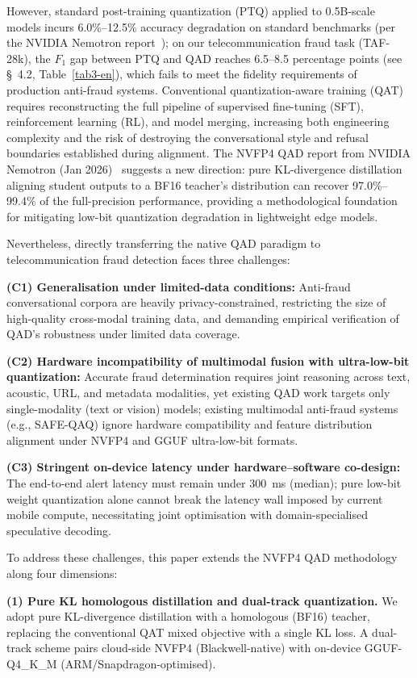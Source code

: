 \documentclass[11pt, a4paper]{article}
\begin{document}
However, standard post-training quantization (PTQ) applied to 0.5B-scale models incurs 6.0\%--12.5\% accuracy degradation on standard benchmarks (per the NVIDIA Nemotron report~\cite{3}); on our telecommunication fraud task (TAF-28k), the $F_1$ gap between PTQ and QAD reaches 6.5--8.5 percentage points (see \S~4.2, Table~\ref{tab3-en}), which fails to meet the fidelity requirements of production anti-fraud systems. Conventional quantization-aware training (QAT) requires reconstructing the full pipeline of supervised fine-tuning (SFT), reinforcement learning (RL), and model merging, increasing both engineering complexity and the risk of destroying the conversational style and refusal boundaries established during alignment. The NVFP4 QAD report from NVIDIA Nemotron (Jan 2026)~\cite{3} suggests a new direction: pure KL-divergence distillation aligning student outputs to a BF16 teacher's distribution can recover 97.0\%--99.4\% of the full-precision performance, providing a methodological foundation for mitigating low-bit quantization degradation in lightweight edge models.

Nevertheless, directly transferring the native QAD paradigm to telecommunication fraud detection faces three challenges:

\textbf{(C1) Generalisation under limited-data conditions:} Anti-fraud conversational corpora are heavily privacy-constrained, restricting the size of high-quality cross-modal training data, and demanding empirical verification of QAD's robustness under limited data coverage.

\textbf{(C2) Hardware incompatibility of multimodal fusion with ultra-low-bit quantization:} Accurate fraud determination requires joint reasoning across text, acoustic, URL, and metadata modalities, yet existing QAD work targets only single-modality (text or vision) models; existing multimodal anti-fraud systems (e.g., SAFE-QAQ) ignore hardware compatibility and feature distribution alignment under NVFP4 and GGUF ultra-low-bit formats.

\textbf{(C3) Stringent on-device latency under hardware--software co-design:} The end-to-end alert latency must remain under 300~ms (median); pure low-bit weight quantization alone cannot break the latency wall imposed by current mobile compute, necessitating joint optimisation with domain-specialised speculative decoding.

To address these challenges, this paper extends the NVFP4 QAD methodology along four dimensions:

\textbf{(1) Pure KL homologous distillation and dual-track quantization.} We adopt pure KL-divergence distillation with a homologous (BF16) teacher, replacing the conventional QAT mixed objective with a single KL loss. A dual-track scheme pairs cloud-side NVFP4 (Blackwell-native) with on-device GGUF-Q4\_K\_M (ARM/Snapdragon-optimised).
\end{document}
